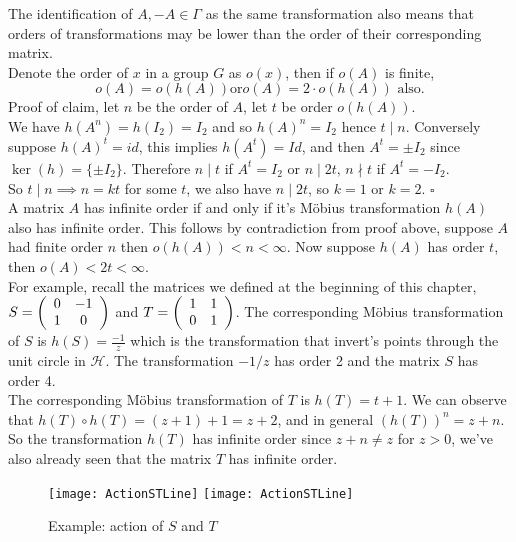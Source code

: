 \begin{remark}
The identification of $A,-A \in \Gamma$ as the same transformation also means that orders of transformations may be lower than the order of their corresponding matrix. \\
Denote the order of $x$ in a group $G$ as $o(x)$, then if $o(A)$ is finite,
$$  o(A) = o(h(A)) \text{or}  o(A)  = 2 \cdot o(h(A)) \text{ also.}$$
Proof of claim, let $n$ be the order of $A$, let $t$ be order $o(h(A))$.\\  
We have $h(A^n) = h(I_2) = I_2$ and so $h(A)^n = I_2$ hence $t \mid n$.
Conversely suppose $h(A)^t = id$, this implies $h(A^t) = Id$,  and then $A^t= \pm I_2$ since $\ker(h) = \{\pm I_2 \}$. Therefore $n \mid t$ if $A^t = I_2$ or $n \mid 2t, \, n \nmid t$ if $A^t = -I_2$. \\
So $t \mid n \implies n = kt$ for some $t$, we also have $n \mid 2t$, so $k =1$ or $k =2$. $\square$
\\

A matrix $A$ has infinite order if and only if it's Möbius transformation $h(A)$ also has infinite order. This follows by contradiction from proof above, suppose $A$ had finite order $n$ then $o(h(A)) < n < \infty$. Now suppose $h(A)$ has order $t$, then $o(A) < 2t < \infty $. 
\\
For example, recall the matrices we defined at the beginning of this chapter, $ S = \left(\begin{array}{ c c } 0 & -1 \\ 1 & 0 \end{array} \right)$ and $T = \left(\begin{array}{ c c } 1 & 1 \\ 0 & 1 \end{array} \right)$. The corresponding Möbius transformation of $S$ is $h(S) = \frac{-1}{z}$ which is the transformation that invert's points through the unit circle in $\mathcal{H}$. The transformation $-1/z$ has order 2 and the matrix $S$ has order 4. \\
The corresponding Möbius transformation of $T$ is $h(T) = t + 1$. We can observe that $h(T)\circ h(T) = (z + 1) +1 = z + 2$, and in general $(h(T))^n = z + n$. So the transformation $h(T)$ has infinite order since $z + n \neq z$ for $z > 0$, we've also already seen that the matrix $T$ has infinite order.
\end{remark}


\begin{figure}[!htbp]
  \begin{center}
    \leavevmode
    \ifpdf
      \texttt{[image: ActionSTLine]}
    \else
      \texttt{[image: ActionSTLine]}
    \fi
    \caption{Example: action of $S$ and $T$}
    \label{fig:actionST}
  \end{center}
\end{figure}

